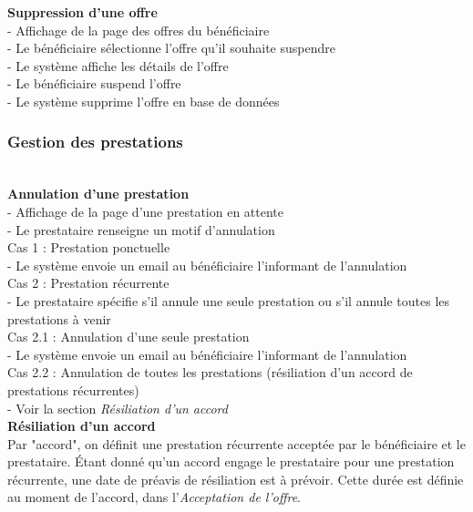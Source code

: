\documentclass[conference]{IEEEtran}
\begin{document}
\textbf{Suppression d'une offre}\hfil\\
- Affichage de la page des offres du bénéficiaire\\
- Le bénéficiaire sélectionne l'offre qu'il souhaite suspendre\\
- Le système affiche les détails de l'offre\\
- Le bénéficiaire suspend l'offre\\
- Le système supprime l'offre en base de données\\


\subsubsection{Gestion des prestations}\hfil\\

\textbf{Annulation d'une prestation}\hfil\\
- Affichage de la page d'une prestation en attente\\
- Le prestataire renseigne un motif d'annulation\\

Cas 1 : Prestation ponctuelle\\
- Le système envoie un email au bénéficiaire l'informant de l'annulation\\

Cas 2 : Prestation récurrente\\
- Le prestataire spécifie s'il annule une seule prestation ou s'il annule toutes les prestations à venir\\

Cas 2.1 : Annulation d'une seule prestation\\
- Le système envoie un email au bénéficiaire l'informant de l'annulation\\

Cas 2.2 : Annulation de toutes les prestations (résiliation d'un accord de prestations récurrentes)\\
- Voir la section \textit{Résiliation d'un accord}\\

\textbf{Résiliation d'un accord}\hfil\\
Par "accord", on définit une prestation récurrente acceptée par le bénéficiaire et le prestataire. Étant donné qu'un accord engage le prestataire pour une prestation récurrente, une date de préavis de résiliation est à prévoir. Cette durée est définie au moment de l'accord, dans l'\textit{Acceptation de l'offre}.\\
\end{document}
